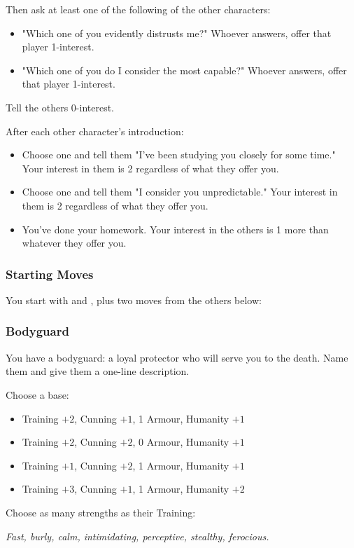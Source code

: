 Then ask at least one of the following of the other characters:
\begin{itemize}
\item "Which one of you evidently distrusts me?" Whoever answers, offer that player 1-interest.
\item "Which one of you do I consider the most capable?" Whoever answers, offer that player 1-interest.
\end{itemize}
Tell the others 0-interest.

After each other character's introduction:
\begin{itemize}
\item Choose one and tell them "I've been studying you closely for some time." Your interest in them is 2 regardless of what they offer you.
\item Choose one and tell them "I consider you unpredictable." Your interest in them is 2 regardless of what they offer you.
\item You’ve done your homework. Your interest in the others is 1 more than whatever they offer you.
\end{itemize}

\subsubsection{Starting Moves}
You start with  and , plus two moves from the others below:

\subsubsection{Bodyguard}\label{sec:Bodyguard}
You have a bodyguard: a loyal protector who will serve you to the death. Name them and give them a one-line description.

Choose a base:
\begin{itemize}
\item Training $+2$, Cunning $+1$, 1 Armour, Humanity $+1$
\item Training $+2$, Cunning $+2$, 0 Armour, Humanity $+1$
\item Training $+1$, Cunning $+2$, 1 Armour, Humanity $+1$
\item Training $+3$, Cunning $+1$, 1 Armour, Humanity $+2$
\end{itemize}

Choose as many strengths as their Training:

\textit{Fast, burly, calm, intimidating, perceptive, stealthy, ferocious.}


